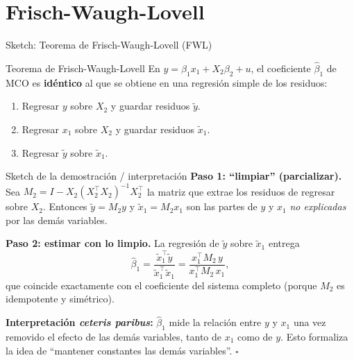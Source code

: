\documentclass{beamer}
\begin{document}
\section{Frisch-Waugh-Lovell}

\begin{frame}[allowframebreaks]{Sketch: Teorema de Frisch-Waugh-Lovell (FWL)}

\begin{alertblock}{Teorema de Frisch-Waugh-Lovell}
En $y = \beta_1 x_1 + X_2\beta_2 + u$, el coeficiente $\hat{\beta}_1$ de MCO es \textbf{idéntico} al que se obtiene en una regresión simple de los residuos:
\begin{enumerate}
    \item Regresar $y$ sobre $X_2$ y guardar residuos $\tilde{y}$.
    \item Regresar $x_1$ sobre $X_2$ y guardar residuos $\tilde{x}_1$.
    \item Regresar $\tilde{y}$ sobre $\tilde{x}_1$.
\end{enumerate}
\end{alertblock}

\begin{exampleblock}{Sketch de la demostración / interpretación}
\textbf{Paso 1: ``limpiar'' (parcializar).} Sea $M_2 = I - X_2(X_2^{\top}X_2)^{-1}X_2^{\top}$ la matriz que extrae los residuos de regresar sobre $X_2$. Entonces $\tilde{y}=M_2 y$ y $\tilde{x}_1=M_2 x_1$ son las partes de $y$ y $x_1$ \emph{no explicadas} por las demás variables.

\framebreak

\textbf{Paso 2: estimar con lo limpio.} La regresión de $\tilde{y}$ sobre $\tilde{x}_1$ entrega
\[
\hat{\beta}_1 = \frac{\tilde{x}_1^{\top}\tilde{y}}{\tilde{x}_1^{\top}\tilde{x}_1} = \frac{x_1^{\top}M_2\,y}{x_1^{\top}M_2\,x_1},
\]
que coincide exactamente con el coeficiente del sistema completo (porque $M_2$ es idempotente y simétrico).

\medskip
\textbf{Interpretación \emph{ceteris paribus}:} $\hat{\beta}_1$ mide la relación entre $y$ y $x_1$ \alert{una vez removido} el efecto de las demás variables, tanto de $x_1$ como de $y$. Esto formaliza la idea de ``mantener constantes las demás variables''. \hfill $\square$
\end{exampleblock}

\end{frame}

\end{document}
